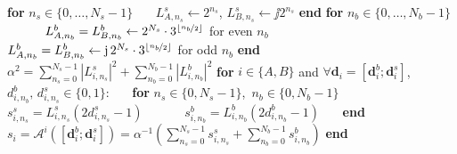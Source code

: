  \begin{algorithmic}[1]
    \State {}  
    \State \textbf{for} $n_s \in \{0,\dots,N_s-1\}$  
      \State  ~~~$L_{A,n_s}^s \gets 2^{n_s}$,  $L_{B,n_s}^s\gets \jj 2^{n_s}$
      \label{alg_line:CTUpp_LAAssignment}
    \State \textbf{end}
    \State \textbf{for} $n_b \in \{0,\dots,N_b-1\}$  
    \State ~~~~~~$L_{A,n_b}^b=L_{B,n_b}^b \gets 2^{N_s} \cdot 3^{\left\lfloor \nicefrac{n_b}{2}\right\rfloor }$ for even $n_b$     
    \label{alg_line:CTUpp_LAXORAssignment}
    \State ~~~~~~$L_{A,n_b}^b=L_{B,n_b}^b \gets \operatorname{j} 2^{N_s} \cdot 3^{\left\lfloor \nicefrac{n_b}{2}\right\rfloor }$ for odd $n_b$ 
    \label{alg_line:CTUpp_LBXORAssignment}
    \State \textbf{end}
    \State $\alpha^{2}=\sum_{n_s=0}^{N_{s}-1}|L_{i,n_s}^{s}|^{2}+\sum_{n_b=0}^{N_{b}-1}|L_{i,n_b}^{b}|^{2}$  \label{alg_line:CTUpp_normalization}
    \State \textbf{for} $i \in \{A,B\}$ and $\forall \mathbf{d}_{i}=\left[\mathbf{d}_{i}^{b};\mathbf{d}_{i}^{s}\right]$, $d^b_{i,n_b},\,d^s_{i,n_s}\in\{0,1\}$: \label{alg_line:CTUpp_input_data}
    \State ~~~\textbf{for} $n_s \in \{0,N_s-1\}$,\, $n_b \in \{0,N_b-1\}$
	\State ~~~~~~$s_{i,n_s}^{s}=L_{i,n_s}^{s}\left(2d_{i,n_s}^{s}-1\right)$
	\State ~~~~~~$s_{i,n_b}^{b}=L_{i,n_b}^{b}\left(2d_{i,n_b}^{b}-1\right)$
      \State ~~~\textbf{end}
      \State ~~~$s_{i}=\mathcal{A}^{i}\left(\left[\mathbf{d}_{i}^{b};\mathbf{d}_{i}^{s}\right]\right)=\alpha^{-1}\left(\sum_{n_s=0}^{N_{s}-1}s_{i,n_s}^{s}+\sum_{n_b=0}^{N_{b}-1}s_{i,n_b}^{b}\right)$    \label{alg_line:CTUpp_const_symbols}
	 \State \textbf{end}
    
	\State {}
  \end{algorithmic}
 
